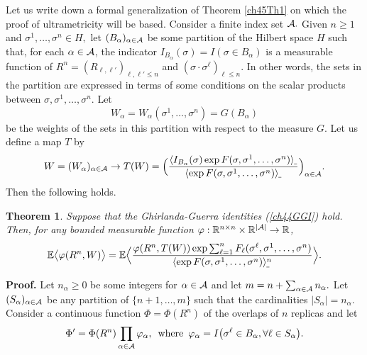 \documentclass[12pt]{article}
\newcommand{\A}{{\cal A}}
\newcommand{\e}{\mathbb{E}}
\newcommand{\Reals}{\mathbb{R}}
\newcommand{\la}{\langle}
\newcommand{\ra}{\rangle}
\newtheorem{theorem}{Theorem}
\theoremstyle{nonumberplain}
\begin{document}
\medskip
Let us write down a formal generalization of Theorem \ref{ch45Th1} on which the proof of ultrametricity will be based. Consider a finite index set $\A.$ Given $n\geq 1$ and $\sigma^1,\ldots,\sigma^n\in H,$  let $(B_\alpha)_{\alpha\in\A}$ be some partition of the Hilbert space $H$ such that, for each $\alpha\in\A$, the indicator 
$
I_{B_\alpha}(\sigma) = I(\sigma\in B_\alpha)
$ 
is a measurable function of $R^n = (R_{\ell,\ell'})_{\ell,\ell'\leq n}$ and $(\sigma\cdot\sigma^{\ell})_{\ell\leq n}$. In other words, the sets in the partition are expressed in terms of some conditions on the scalar products between $\sigma,\sigma^1,\ldots,\sigma^n$. Let
\begin{equation}
W_\alpha=W_\alpha(\sigma^1,\ldots,\sigma^n)=G(B_\alpha)
\label{ch45WA}
\end{equation}
be the weights of the sets in this partition with respect to the measure $G$. Let us define a map $T$ by
\begin{equation}
W=(W_\alpha)_{\alpha\in\A}\to T(W) = 
\Bigl(\frac{\la I_{B_\alpha}(\sigma) \exp F(\sigma,\sigma^1,\ldots,\sigma^n )\ra_{\hspace{-0.3mm}\mathunderscore}}
{\la \exp F(\sigma,\sigma^1,\ldots,\sigma^n )\ra_{\hspace{-0.3mm}\mathunderscore}} \Bigr)_{\alpha\in\A}.
\label{ch45TA}
\end{equation}
Then the following holds.
\begin{theorem}\label{ch45Th2}
Suppose that the Ghirlanda-Guerra identities (\ref{ch44GGI}) hold. Then, for any bounded measurable function $\varphi:\Reals^{n\times n}\times\Reals^{|\A|}\to \Reals$,
\begin{equation}
\e \bigl\la  \varphi(R^n, W) \bigr\ra
=
\e\Bigl\la
\frac{ \varphi(R^n,T(W)) \exp \sum_{\ell=1}^{n} F_{\ell}(\sigma^{\ell},\sigma^1,\ldots,\sigma^n)}
{\la\exp F(\sigma,\sigma^1,\ldots,\sigma^n)\ra_{\hspace{-0.3mm}\mathunderscore}^n}
\Bigr\ra.
\label{ch45nA}
\end{equation}
\end{theorem}
\noindent\textbf{Proof.}
Let $n_\alpha\geq 0$ be some integers for $\alpha\in\A$ and let $m=n+\sum_{\alpha\in\A} n_\alpha.$ Let $(S_\alpha)_{\alpha\in\A}$ be any partition of $\{n+1,\ldots,m\}$ such that the cardinalities $|S_\alpha |=n_\alpha.$ Consider a continuous function $\Phi = \Phi(R^n)$ of the overlaps of $n$ replicas and let 
$$
\Phi' = \Phi(R^n) \prod_{\alpha\in\A}\varphi_\alpha,
\,\mbox{ where }\,
\varphi_\alpha = I \bigl(\sigma^{\ell} \in B_\alpha, \forall \ell\in S_\alpha \bigr).
$$
\end{document}
